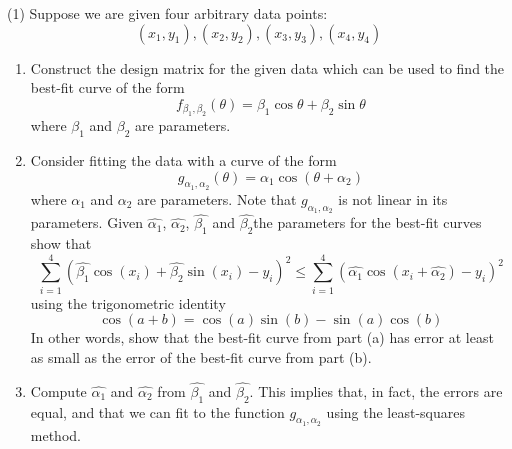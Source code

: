 \begin{tasks}[resume, style=enumerate](1)
\task
  Suppose we are given four arbitrary data points:
  \begin{displaymath}
    (x_1, y_1), (x_2, y_2), (x_3, y_3), (x_4, y_4)
  \end{displaymath}

  \begin{enumerate}[label=(\alph*)]
  \item
    Construct the design matrix for the given data which can be used
    to find the best-fit curve of the form
    \begin{displaymath}
      f_{\beta_1, \beta_2}(\theta) = \beta_1 \cos\theta + \beta_2
      \sin\theta
    \end{displaymath}
    where $\beta_1$ and $\beta_2$ are parameters.
  \item
    Consider fitting the data with a curve of the form
    \begin{displaymath}
      g_{\alpha_1, \alpha_2}(\theta) = \alpha_1\cos(\theta + \alpha_2)
    \end{displaymath}
    where $\alpha_1$ and $\alpha_2$ are parameters. Note that
    $g_{\alpha_1, \alpha_2}$ is not linear in its parameters.  Given
    $\hat{\alpha_1}$, $\hat{\alpha_2}$, $\hat{\beta_1}$ and
    $\hat{\beta_2}$\textemdash the parameters for the best-fit curves
    \textemdash show that
    \begin{displaymath}
      \sum_{i = 1}^4
      \left(
      \hat{\beta_1}\cos(x_i) + \hat{\beta_2}\sin(x_i) - y_i
      \right)^2
      \leq
      \sum_{i = 1}^4
      \left(
      \hat{\alpha_1} \cos(x_i + \hat{\alpha_2}) - y_i
      \right)^2
    \end{displaymath}
    using the trigonometric identity
    \begin{displaymath}
      \cos(a + b) = \cos(a)\sin(b) - \sin(a)\cos(b)
    \end{displaymath}
    In other words, show that the best-fit curve from part (a) has error
    at least as small as the error of the best-fit curve from part (b).
  \item
    Compute $\hat{\alpha_1}$ and $\hat{\alpha_2}$ from $\hat{\beta_1}$
    and $\hat{\beta_2}$. This implies that, in fact, the errors are
    equal, and that we can fit to the function $g_{\alpha_1,
      \alpha_2}$ using the least-squares method.
  \end{enumerate}
\end{tasks}

